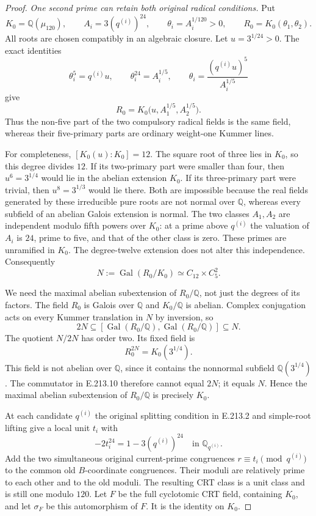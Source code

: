 \begin{proof}
\emph{One second prime can retain both original radical conditions.}
Put
\[
 K_0=\mathbb Q(\mu_{120}),\qquad
 A_i=3(q^{(i)})^{24},\qquad
 \theta_i=A_i^{1/120}>0,\qquad
 R_0=K_0(\theta_1,\theta_2).
 \tag{E.213.6}
\]
All roots are chosen compatibly in an algebraic closure.
Let $u=3^{1/24}>0$. The exact identities
\[
 \theta_i^5=q^{(i)}u,\qquad
 \theta_i^{24}=A_i^{1/5},\qquad
 \theta_i=\frac{(q^{(i)}u)^5}{A_i^{1/5}}
 \tag{E.213.7}
\]
give
\[
 R_0=K_0\bigl(u,A_1^{1/5},A_2^{1/5}\bigr).
 \tag{E.213.8}
\]
Thus the non-five part of the two compulsory radical fields
is the same field, whereas their five-primary parts are
ordinary weight-one Kummer lines.

For completeness, $[K_0(u):K_0]=12$. The square root of
three lies in $K_0$, so this degree divides $12$.
If its two-primary part were smaller than four, then
$u^6=3^{1/4}$ would lie in the abelian extension $K_0$.
If its three-primary part were trivial, then
$u^8=3^{1/3}$ would lie there. Both are impossible because
the real fields generated by these irreducible pure roots
are not normal over $\mathbb Q$, whereas every subfield of
an abelian Galois extension is normal.
The two classes $A_1,A_2$ are independent modulo fifth powers
over $K_0$: at a prime above $q^{(i)}$ the valuation of $A_i$
is $24$, prime to five, and that of the other class is zero.
These primes are unramified in $K_0$. The degree-twelve
extension does not alter this independence. Consequently
\[
 N:=\operatorname{Gal}(R_0/K_0)
       \simeq C_{12}\times C_5^2.                            \tag{E.213.9}
\]

We need the maximal abelian subextension of $R_0/\mathbb Q$,
not just the degrees of its factors. The field $R_0$ is
Galois over $\mathbb Q$ and $K_0/\mathbb Q$ is abelian.
Complex conjugation acts on every Kummer translation in
$N$ by inversion, so
\[
       2N\subseteq
       [\operatorname{Gal}(R_0/\mathbb Q),
        \operatorname{Gal}(R_0/\mathbb Q)]\subseteq N.
 \tag{E.213.10}
\]
The quotient $N/2N$ has order two. Its fixed field is
\[
                         R_0^{2N}=K_0(3^{1/4}).              \tag{E.213.11}
\]
This field is not abelian over $\mathbb Q$, since it
contains the nonnormal subfield $\mathbb Q(3^{1/4})$.
The commutator in E.213.10 therefore cannot equal $2N$;
it equals $N$. Hence the maximal abelian subextension of
$R_0/\mathbb Q$ is precisely $K_0$.

At each candidate $q^{(i)}$ the original splitting condition
in E.213.2 and simple-root lifting give a local unit $t_i$
with
\[
       -2t_i^{24}=1-3(q^{(i)})^{24}
       \quad\text{in }\mathbb Q_{q^{(i)}}.                   \tag{E.213.12}
\]
Add the two simultaneous original current-prime congruences
$r\equiv t_i\pmod{q^{(i)}}$ to the common old $B$-coordinate
congruences. Their moduli are relatively prime to each
other and to the old moduli. The resulting CRT class is a
unit class and is still one modulo $120$.
Let $F$ be the full cyclotomic CRT field, containing
$K_0$, and let $\sigma_F$ be this automorphism of $F$.
It is the identity on $K_0$.


\end{proof}
